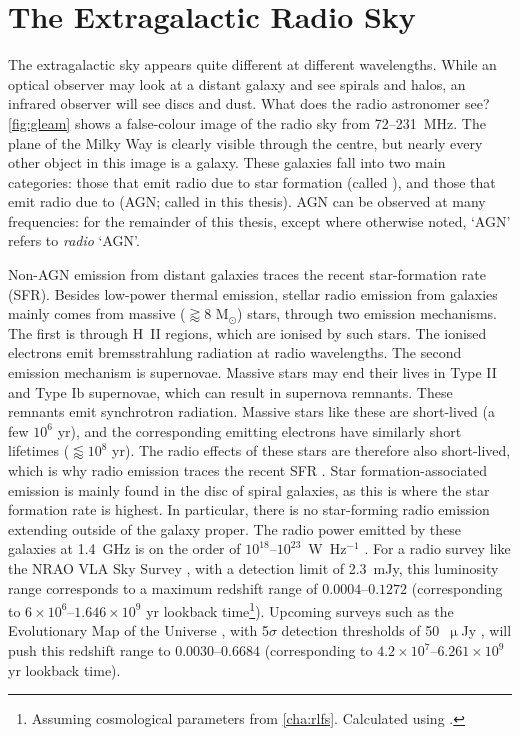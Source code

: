 \section{The Extragalactic Radio Sky}
\label{sec:extragalactic-radio-sky}

    The extragalactic sky appears quite different at different wavelengths. While an optical observer may look at a distant galaxy and see spirals and halos, an infrared observer will see discs and dust. What does the radio astronomer see? 
    \autoref{fig:gleam} shows a false-colour image of the radio sky from 72--231~MHz. The plane of the Milky Way is clearly visible through the centre, but nearly every other object in this image is a galaxy. These galaxies fall into two main categories: those that emit radio due to star formation (called ), and those that emit radio due to  (AGN; called  in this thesis). AGN can be observed at many frequencies: for the remainder of this thesis, except where otherwise noted, `AGN' refers to \emph{radio} `AGN'.

    Non-AGN emission from distant galaxies traces the recent star-formation rate (SFR). Besides low-power thermal emission, stellar radio emission from galaxies mainly comes from massive ($\gtrapprox 8$ M$_\odot$) stars, through two emission mechanisms. The first is through H~II regions, which are ionised by such stars. The ionised electrons emit bremsstrahlung radiation at radio wavelengths. The second emission mechanism is supernovae. Massive stars may end their lives in Type II and Type Ib supernovae, which can result in supernova remnants. These remnants emit synchrotron radiation. Massive stars like these are short-lived (a few $10^6$ yr), and the corresponding emitting electrons have similarly short lifetimes ($\lessapprox 10^8$ yr). The radio effects of these stars are therefore also short-lived, which is why radio emission traces the recent SFR \citep{condon92radio}. Star formation-associated emission is mainly found in the disc of spiral galaxies, as this is where the star formation rate is highest. In particular, there is no star-forming radio emission extending outside of the galaxy proper. The radio power emitted by these galaxies at 1.4~GHz is on the order of $10^{18}$--$10^{23}$~W~Hz$^{-1}$ \citep{condon92radio}. For a radio survey like the NRAO VLA Sky Survey \citep[NVSS;][]{condon98nvss}, with a detection limit of 2.3~mJy, this luminosity range corresponds to a maximum redshift range of $0.0004$--$0.1272$ (corresponding to $6\times10^6$--$1.646\times10^9$ yr lookback time\footnote{Assuming cosmological parameters from \autoref{cha:rlfs}. Calculated using  \citep{wright2006ned}.}). Upcoming surveys such as the Evolutionary Map of the Universe \citep[EMU;][]{norris11}, with 5$\sigma$ detection thresholds of 50~$\upmu${}Jy \citep{norris11}, will push this redshift range to $0.0030$--$0.6684$ (corresponding to $4.2\times10^7$--$6.261\times10^9$ yr lookback time).


